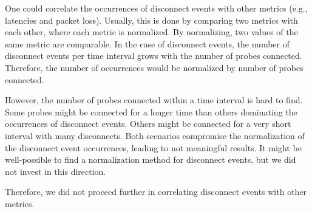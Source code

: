 One could correlate the occurrences of disconnect events with other metrics
(e.g., latencies and packet loss). Usually, this is done by comparing two
metrics with each other, where each metric is normalized. By normalizing, two
values of the same metric are comparable. In the case of disconnect events, the
number of disconnect events per time interval grows with the number of probes
connected. Therefore, the number of occurrences would be normalized by number
of probes connected.

However, the number of probes connected within a time interval is hard to find.
Some probes might be connected for a longer time than others dominating the
occurrences of disconnect events. Others might be connected for a very short
interval with many disconnects. Both scenarios compromise the normalization of
the disconnect event occurrences, leading to not meaningful results. It might
be well-possible to find a normalization method for disconnect events, but we
did not invest in this direction.

Therefore, we did not proceed further in correlating disconnect events with
other metrics.
